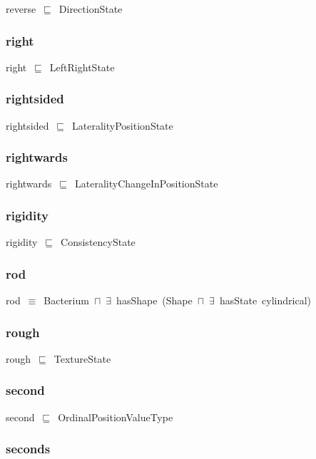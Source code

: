 \documentclass{article}
\begin{document}
reverse~\ensuremath{\sqsubseteq}~DirectionState~

\subsubsection*{right}

right~\ensuremath{\sqsubseteq}~LeftRightState~

\subsubsection*{rightsided}

rightsided~\ensuremath{\sqsubseteq}~LateralityPositionState~

\subsubsection*{rightwards}

rightwards~\ensuremath{\sqsubseteq}~LateralityChangeInPositionState~

\subsubsection*{rigidity}

rigidity~\ensuremath{\sqsubseteq}~ConsistencyState~

\subsubsection*{rod}

rod~\ensuremath{\equiv}~Bacterium~\ensuremath{\sqcap}~\ensuremath{\exists}~hasShape~(Shape~\ensuremath{\sqcap}~\ensuremath{\exists}~hasState~cylindrical)

\subsubsection*{rough}

rough~\ensuremath{\sqsubseteq}~TextureState~

\subsubsection*{second}

second~\ensuremath{\sqsubseteq}~OrdinalPositionValueType~

\subsubsection*{seconds}
\end{document}
